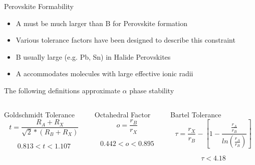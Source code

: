 \documentclass[10pt, aspectratio=169, presentation]{beamer}
\begin{document}
\begin{frame}[label={sec:org88fcc44}]{Perovskite Formability}
\begin{itemize}
\item A must be much larger than B for Perovskite formation
\item Various tolerance factors have been designed to describe this constraint
\item B usually large (e.g. Pb, Sn) in Halide Perovskites
\item A accommodates \alert{molecules} with large effective ionic radii\autocite{kieslich-2015-exten-toler}
\end{itemize}

The following definitions approximate \(\alpha\) phase stability
\autocite{yin-2015-halid-perov,bartel-2019-new-toler}
\begin{columns}
\begin{column}{0.33\columnwidth}
\begin{block}{Goldschmidt Tolerance}
\[
t = \frac{R_A+R_X}{\sqrt{2}*(R_B+R_X)}
\]

\[
0.813 < t < 1.107
\]
\end{block}
\end{column}

\begin{column}{0.33\columnwidth}
\begin{block}{Octahedral Factor}
\[
o=\frac{r_B}{r_X}
\]

\[
0.442 < o < 0.895
\]
\end{block}
\end{column}

\begin{column}{0.33\columnwidth}
\begin{block}{Bartel Tolerance}
\[
\tau = \frac{r_X}{r_B}-\left[ 1-\frac{\frac{r_A}{r_B}}{ln(\frac{r_A}{r_B})} \right]
\]

\[
\tau < 4.18
\]
\end{block}
\end{column}
\end{columns}
\end{frame}
\end{document}
